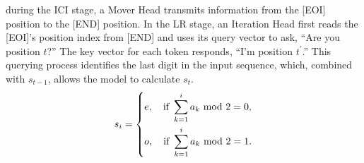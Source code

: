 \documentclass[12pt,letterpaper]{article}
\begin{document}
 during the ICI stage, a Mover Head transmits information from the [EOI] position to the [END] position.
In the LR stage, an Iteration Head first reads the [EOI]'s position index from [END] and uses its query vector to ask, ``Are you position $t$?'' The key vector for each token responds, ``I'm position $t^{'}$.'' This querying process identifies the last digit in the input sequence, which, combined with $s_{t-1}$, allows the model to calculate $s_{t}$.
\begin{equation}
\label{equ:parity}
\textcolor{black}{
s_i = 
\left\{
\begin{aligned}
    & e, \quad \text{if } \sum_{k=1}^{i} a_k \text{ mod } 2 = 0, \\
    & o, \quad \text{if } \sum_{k=1}^{i} a_k \text{ mod }  2 = 1.
\end{aligned}
\right.
}
\end{equation}
\end{document}
